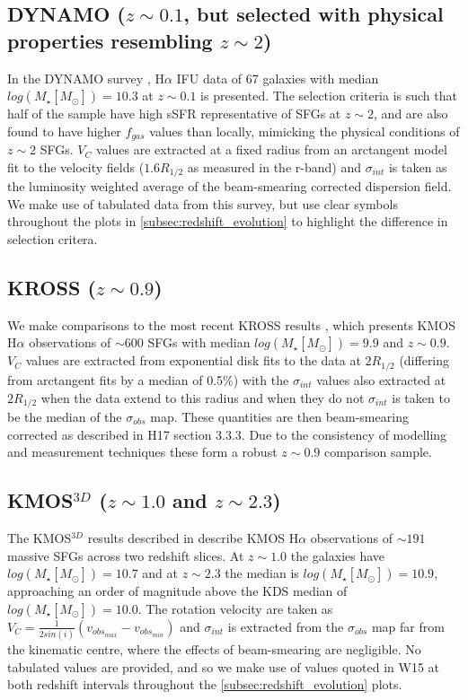 \documentclass[fleqn,usenatbib]{mn2e}
\begin{document}
\subsection{DYNAMO ($z\sim0.1$, but selected with physical properties resembling $z\sim2$)}\label{subsec:DYNAMO}
In the DYNAMO survey \citep[G14]{Green2014}, H$\alpha$ IFU data of 67 galaxies with median $log(M_{\star}[M_{\odot}])=10.3$ at $z\sim0.1$ is presented.
The selection criteria is such that half of the sample have high sSFR representative of SFGs at $z\sim 2$, and are also found to have higher $f_{gas}$ values than locally, mimicking the physical conditions of $z\sim 2$ SFGs.
$V_{C}$ values are extracted at a fixed radius from an arctangent model fit to the velocity fields ($1.6R_{1/2}$ as measured in the r-band) and $\sigma_{int}$ is taken as the luminosity weighted average of the beam-smearing corrected dispersion field.
We make use of tabulated data from this survey, but use clear symbols throughout the plots in \cref{subsec:redshift_evolution} to highlight the difference in selection critera.

\subsection{KROSS ($z\sim0.9$)}\label{subsec:KROSS}
We make comparisons to the most recent KROSS results \citep[H17]{Harrison2017}, which presents KMOS H$\alpha$ observations of $\sim600$ SFGs with median $log(M_{\star}[M_{\odot}])=9.9$ and $z\sim0.9$.
$V_{C}$ values are extracted from exponential disk fits to the data at $2R_{1/2}$ (differing from arctangent fits by a median of 0.5\%) with the $\sigma_{int}$ values also extracted at $2R_{1/2}$ when the data extend to this radius and when they do not $\sigma_{int}$ is taken to be the median of the $\sigma_{obs}$ map.
These quantities are then beam-smearing corrected as described in H17 section 3.3.3. 
Due to the consistency of modelling and measurement techniques these form a robust $z\sim0.9$ comparison sample.

\subsection{KMOS$^{3D}$ ($z\sim1.0$ and $z\sim2.3$)}\label{subsec:kmos_3d}
The KMOS$^{3D}$ results described in \cite[W15]{Wisnioski2015} describe KMOS H$\alpha$ observations of $\sim191$ massive SFGs across two redshift slices. 
At $z \sim 1.0$ the galaxies have $log(M_{\star}[M_{\odot}])=10.7$ and at $z \sim 2.3$ the median is $log(M_{\star}[M_{\odot}])=10.9$, approaching an order of magnitude above the KDS median of $log(M_{\star}[M_{\odot}])=10.0$.   The rotation velocity are taken as $V_{C} = \frac{1}{2sin(i)}(v_{obs_{max}} - v_{obs_{min}})$ and $\sigma_{int}$ is extracted from the $\sigma_{obs}$ map far from the kinematic centre, where the effects of beam-smearing are negligible.
No tabulated values are provided, and so we make use of values quoted in W15 at both redshift intervals throughout the \cref{subsec:redshift_evolution} plots.
\end{document}
